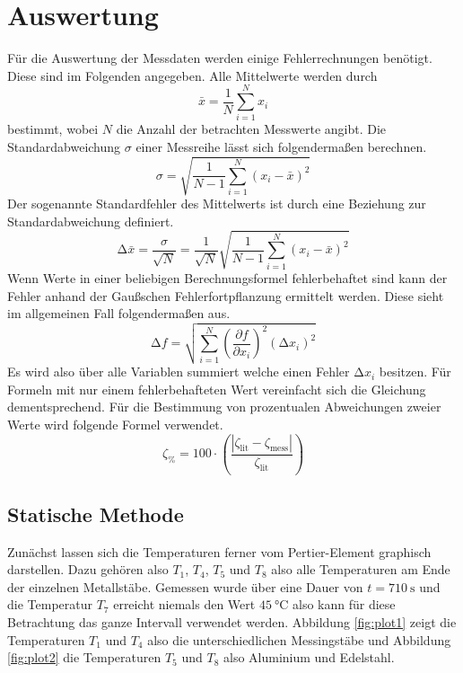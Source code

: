 \section{Auswertung}
Für die Auswertung der Messdaten werden einige Fehlerrechnungen benötigt. Diese sind im Folgenden angegeben.
Alle Mittelwerte werden durch
\begin{equation}
    \label{eqn:mittel}
\bar{x} = \frac{1}{N} \sum_{i=1}^{N} x_{i}
\end{equation}
bestimmt, wobei $N$ die Anzahl der betrachten Messwerte angibt. Die Standardabweichung $\sigma$ einer Messreihe lässt sich folgendermaßen berechnen.
\begin{equation}
\sigma = \sqrt{\frac{1}{N-1}\sum_{i=1}^{N} (x_{i} -\bar{x})^2 }
\end{equation}
Der sogenannte Standardfehler des Mittelwerts ist durch eine Beziehung zur Standardabweichung definiert.
\begin{equation}
    \label{eqn:sem}
\increment \bar{x} = \frac{\sigma}{\sqrt{N}} = \frac{1}{\sqrt{N}} \sqrt{\frac{1}{N-1}\sum_{i=1}^{N} (x_{i} -\bar{x})^2 }
\end{equation}
Wenn Werte in einer beliebigen Berechnungsformel fehlerbehaftet sind kann der Fehler anhand der Gaußschen Fehlerfortpflanzung ermittelt werden. Diese sieht im allgemeinen Fall folgendermaßen aus.
\begin{equation}
    \label{eqn:gauss}
\increment f = \sqrt{\sum_{i=1}^{N} \left( \frac{\partial f}{\partial x_{i}}\right)^2 (\increment x_{i})^2}
\end{equation}
Es wird also über alle Variablen summiert welche einen Fehler $\increment x_{i}$ besitzen. Für Formeln mit nur einem fehlerbehafteten Wert vereinfacht sich die Gleichung dementsprechend.
Für die Bestimmung von prozentualen Abweichungen zweier Werte wird folgende Formel verwendet.
\begin{equation}
    \label{eqn:lol}
\zeta_{\si{\percent}} = 100 \cdot \left( \frac{|\zeta_{\text{lit}} - \zeta_{\text{mess}}|}{\zeta_{\text{lit}}} \right)
\end{equation}

\subsection{Statische Methode}
Zunächst lassen sich die Temperaturen ferner vom Pertier-Element graphisch darstellen. Dazu gehören also $T_{1}$, $T_{4}$, $T_{5}$ und $T_{8}$ also alle Temperaturen am Ende der einzelnen Metallstäbe.
Gemessen wurde über eine Dauer von $t = \SI{710}{\second}$ und die Temperatur $T_{7}$ erreicht niemals den Wert $\SI{45}{\celsius}$ also kann für diese Betrachtung das ganze Intervall verwendet werden.
Abbildung \ref{fig:plot1} zeigt die Temperaturen $T_{1}$ und $T_{4}$ also die unterschiedlichen Messingstäbe und Abbildung \ref{fig:plot2} die Temperaturen $T_{5}$ und $T_{8}$ also Aluminium und Edelstahl.

